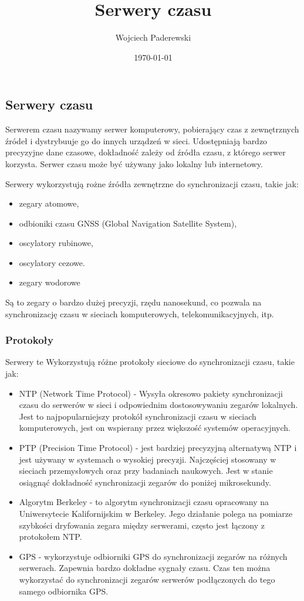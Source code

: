 \documentclass[../main.tex]{subfiles}
\author{Wojciech Paderewski}
\date{\today}
\title{Serwery czasu}
\begin{document}
\subsection{Serwery czasu}

Serwerem czasu nazywamy serwer komputerowy, pobierający czas z zewnętrznych źródeł i dystrybuuje go do innych urządzeń w sieci.
Udostępniają bardzo precyzyjne dane czasowe, dokładność zależy od źródła czasu, z którego serwer korzysta. Serwer czasu może być używany jako lokalny lub internetowy.

Serwery wykorzystują rożne źródła zewnętrzne do synchronizacji czasu, takie jak:
\begin{itemize}
  \item zegary atomowe,
  \item odbioniki czasu GNSS (Global Navigation Satellite System),
  \item oscylatory rubinowe,
  \item oscylatory cezowe.
  \item zegary wodorowe
\end{itemize}

Są to zegary o bardzo dużej precyzji, rzędu nanosekund, co pozwala na synchronizację czasu w sieciach komputerowych, telekomunikacyjnych, itp.

\subsubsection{Protokoły}
Serwery te Wykorzystują różne protokoły sieciowe do synchronizacji czasu, takie jak:
\begin{itemize}
  \item NTP (Network Time Protocol) - 
  Wysyła okresowo pakiety synchronizacji czasu do serwerów w sieci i odpowiednim dostosowywaniu zegarów lokalnych.
  Jest to najpopularniejszy protokół synchronizacji czasu w sieciach komputerowych, jest on wspierany przez większość systemów operacyjnych.
  \item PTP (Precision Time Protocol) - 
  jest bardziej precyzyjną alternatywą NTP i jest używany w systemach o wysokiej precyzji. Najczęściej stosowany w sieciach przemysłowych oraz przy badaniach naukowych. 
  Jest w stanie osiągnąć dokładność synchronizacji zegarów do poniżej mikrosekundy.
  \item Algorytm Berkeley - to algorytm synchronizacji czasu opracowany na Uniwersytecie Kalifornijskim w Berkeley. 
  Jego działanie polega na pomiarze szybkości dryfowania zegara między serwerami, często jest łączony z protokołem NTP.
  \item GPS -  wykorzystuje odbiorniki GPS do synchronizacji zegarów na różnych serwerach.
   Zapewnia bardzo dokładne sygnały czasu. Czas ten można wykorzystać do synchronizacji
  zegarów serwerów podłączonych do tego samego odbiornika GPS. 
\end{itemize}
\end{document}
